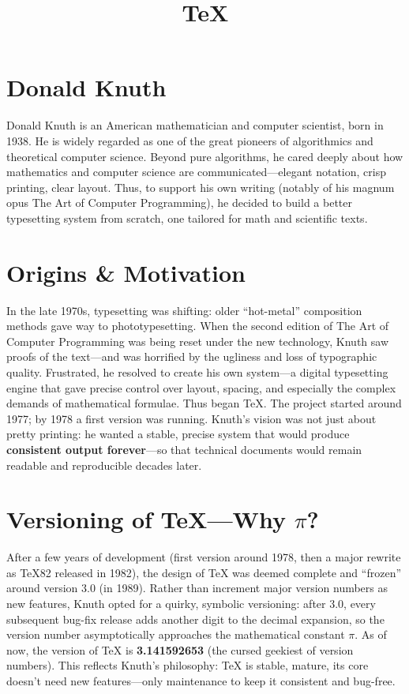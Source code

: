 \documentclass[a4paper,twoside]{article}
\title{\TeX{}}
\author{}\date{}
\begin{document}
\maketitle
\section{Donald Knuth}
Donald Knuth is an American mathematician and computer scientist, born in 1938.
He is widely regarded as one of the great pioneers of algorithmics and theoretical computer science. Beyond pure algorithms, he cared deeply about how mathematics and computer science are communicated---elegant notation, crisp printing, clear layout. Thus, to support his own writing (notably of his magnum opus The Art of Computer Programming), he decided to build a better typesetting system from scratch, one tailored for math and scientific texts.
\section{Origins \& Motivation}
In the late 1970s, typesetting was shifting: older \enquote{hot-metal} composition methods gave way to phototypesetting. When the second edition of The Art of Computer Programming was being reset under the new technology, Knuth saw proofs of the text---and was horrified by the ugliness and loss of typographic quality.
Frustrated, he resolved to create his own system---a digital typesetting engine that gave precise control over layout, spacing, and especially the complex demands of mathematical formulae.
Thus began \TeX{}. The project started around 1977; by 1978 a first version was running.
Knuth's vision was not just about pretty printing: he wanted a stable, precise system that would produce \textbf{consistent output forever}---so that technical documents would remain readable and reproducible decades later.
\section{Versioning of \TeX{}---Why $\pi$?}
After a few years of development (first version around 1978, then a major rewrite as TeX82 released in 1982), the design of \TeX{} was deemed complete and \enquote{frozen} around version 3.0 (in 1989).
Rather than increment major version numbers as new features, Knuth opted for a quirky, symbolic versioning: after 3.0, every subsequent bug-fix release adds another digit to the decimal expansion, so the version number asymptotically approaches the mathematical constant $\pi$.
As of now, the version of \TeX{} is \textbf{3.141592653} (the cursed geekiest of version numbers).
This reflects Knuth's philosophy: \TeX{} is stable, mature, its core doesn't need new features---only maintenance to keep it consistent and bug-free.
\end{document}
